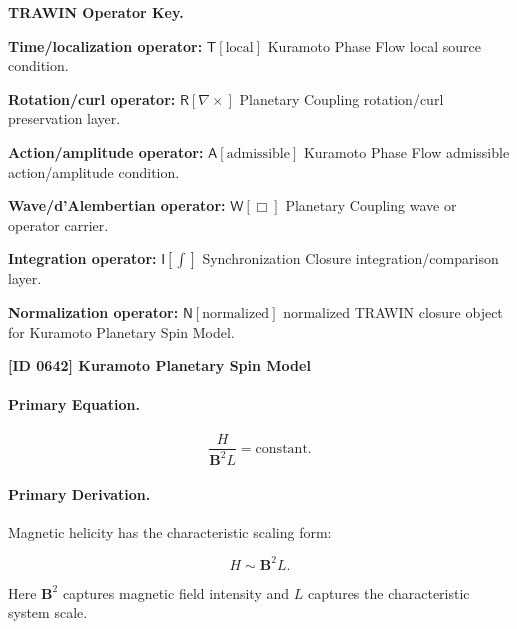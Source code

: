 \par\vspace{0.45\baselineskip}
\noindent\begin{minipage}[t]{\linewidth}
\begingroup
\small
\raggedright
\textbf{TRAWIN Operator Key.}\par
\noindent\textbf{Time/localization operator:} $\mathsf{T}\!\left[\mathrm{local}\right]$ Kuramoto Phase Flow local source condition.\par
\noindent\textbf{Rotation/curl operator:} $\mathsf{R}\!\left[\nabla\times\right]$ Planetary Coupling rotation/curl preservation layer.\par
\noindent\textbf{Action/amplitude operator:} $\mathsf{A}\!\left[\mathrm{admissible}\right]$ Kuramoto Phase Flow admissible action/amplitude condition.\par
\noindent\textbf{Wave/d'Alembertian operator:} $\mathsf{W}\!\left[\Box\right]$ Planetary Coupling wave or operator carrier.\par
\noindent\textbf{Integration operator:} $\mathsf{I}\!\left[\int\right]$ Synchronization Closure integration/comparison layer.\par
\noindent\textbf{Normalization operator:} $\mathsf{N}\!\left[\mathrm{normalized}\right]$ normalized TRAWIN closure object for Kuramoto Planetary Spin Model.\par
\endgroup
\end{minipage}

\clearpage
\noindent\textbf{[ID 0642] Kuramoto Planetary Spin Model}\par
\vspace{0.35em}
\paragraph{Primary Equation.}
\begin{equation}
\frac{H}{\mathbf{B}^2 L}
=
\mathrm{constant}.
\end{equation}

\paragraph{Primary Derivation.}
Magnetic helicity has the characteristic scaling form:

\begin{equation}
H
\sim
\mathbf{B}^2 L .
\end{equation}

Here $\mathbf{B}^2$ captures magnetic field intensity and $L$ captures the characteristic system scale.

